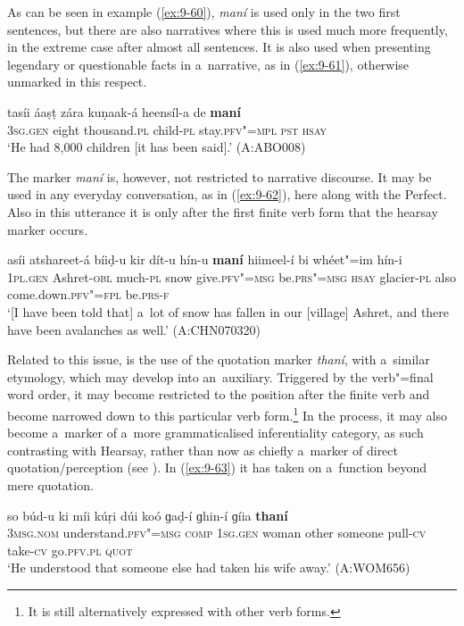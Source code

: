 As can be seen in example (\ref{ex:9-60}), \textit{maní} is used only in the two first sentences, but there are also narratives where this is used much more frequently, in the extreme case after almost all sentences. It is also used when presenting legendary or questionable facts in a~narrative, as in (\ref{ex:9-61}), otherwise unmarked in this respect.

\begin{exe}
\ex
\label{ex:9-61}
\gll tasíi áaṣṭ zára kuṇaak-á heensíl-a de \textbf{maní} \\
3\textsc{sg.gen} eight thousand.\textsc{pl} child-\textsc{pl} stay.\textsc{pfv"=mpl} \textsc{pst} \textsc{hsay} \\
\glt `He had 8,000 children [it has been said].' (A:ABO008)
\end{exe}

The marker \textit{maní} is, however, not restricted to narrative discourse. It may be used in any everyday conversation, as in (\ref{ex:9-62}), here along with the Perfect. Also in this utterance it is only after the first finite verb form that the hearsay marker occurs.

\ea
\label{ex:9-62}
\gll asíi atshareet-á bíiḍ-u kir dít-u hín-u \textbf{maní} hiimeel-í bi whéet"=im hín-i\\
\textsc{1pl.gen} Ashret-\textsc{obl} much-\textsc{pl} snow give.\textsc{pfv"=msg} be.\textsc{prs"=msg} \textsc{hsay} glacier-\textsc{pl} also come.down.\textsc{pfv"=fpl} be.\textsc{prs-f}\\
\glt `[I have been told that] a~lot of snow has fallen in our [village] Ashret, and there have been avalanches as well.' (A:CHN070320)
\z

Related to this issue, is the use of the quotation marker \textit{thaní}, with a~similar etymology, which may develop into an~auxiliary. Triggered by the verb"=final word order, it may become restricted to the position after the finite verb and become narrowed down to this particular verb form.\footnote{It is still alternatively expressed with other verb forms.} In the process, it may also become a~marker of a~more grammaticalised inferentiality category, as such contrasting with Hearsay, rather than now as chiefly a~marker of direct quotation/perception (see ). In (\ref{ex:9-63}) it has taken on a~function beyond mere quotation.

\ea
\label{ex:9-63}
\gll so búd-u ki míi kúṛi dúi koó ɡaḍ-í ɡhin-í ɡíia \textbf{thaní}  \\
\textsc{3msg.nom} understand.\textsc{pfv"=msg} \textsc{comp} \textsc{1sg.gen} woman  other someone pull-\textsc{cv} take-\textsc{cv} go.\textsc{pfv.pl} \textsc{quot} \\
\glt `He understood that someone else had taken his wife away.' (A:WOM656)
\z

